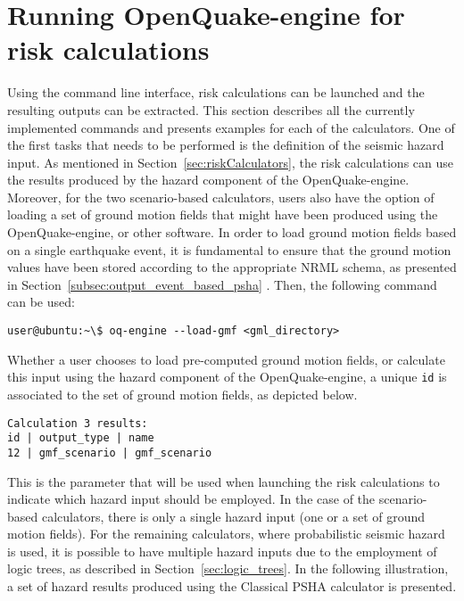 \section{Running OpenQuake-engine for risk calculations}
Using the command line interface, risk calculations can be launched and the resulting outputs can be extracted. This section describes all the currently implemented commands and presents examples for each of the calculators.
One of the first tasks that needs to be performed is the definition of the seismic hazard input. As mentioned in Section~\ref{sec:riskCalculators}, the risk calculations can use the results produced by the hazard component of the OpenQuake-engine. Moreover, for the two scenario-based calculators, users also have the option of loading a set of ground motion fields that might have been produced using the OpenQuake-engine, or other software.
In order to load ground motion fields based on a single earthquake event, it is fundamental to ensure that the ground motion values have been stored according to the appropriate NRML schema, as presented in Section~\ref{subsec:output_event_based_psha}
. Then, the following command can be used:

\begin{Verbatim}[frame=single, commandchars=\\\{\}, samepage=true]
user@ubuntu:~\$ oq-engine --load-gmf <gml_directory>
\end{Verbatim}

Whether a user chooses to load pre-computed ground motion fields, or calculate this input using the hazard component of the OpenQuake-engine, a unique \verb+id+ is associated to the set of ground motion fields, as depicted below.

\begin{Verbatim}[frame=single, commandchars=\\\{\}, samepage=true]
Calculation 3 results:
id | output_type | name
12 | gmf_scenario | gmf_scenario
\end{Verbatim}

This is the parameter that will be used when launching the risk calculations to indicate which hazard input should be employed. In the case of the scenario-based calculators, there is only a single hazard input (one or a set of ground motion fields). For the remaining calculators, where probabilistic seismic hazard is used, it is possible to have multiple hazard inputs due to the employment of logic trees, as described in Section~\ref{sec:logic_trees}. In the following illustration, a set of hazard results produced using the Classical PSHA calculator is presented.


